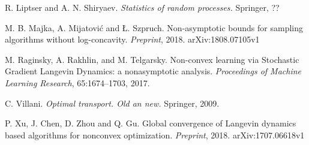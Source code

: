 \documentclass[a4paper,draft]{article}
\begin{document}
\begin{thebibliography}{00}
 R. Liptser and A. N. Shiryaev.
\newblock\emph{Statistics of random processes.}
\newblock Springer, ??

M. B. Majka, A. Mijatovi\'c and \L. Szpruch.
\newblock Non-asymptotic bounds for sampling algorithms
without log-concavity.
\newblock \emph{Preprint}, 2018. arXiv:1808.07105v1

M. Raginsky, A. Rakhlin, and M. Telgarsky.
\newblock Non-convex learning via Stochastic Gradient Langevin Dynamics: a nonasymptotic analysis.
\newblock \emph{Proceedings of Machine Learning Research}, 65:1674--1703, 2017.

 C. Villani.
\newblock \emph{Optimal transport. Old an new.}
\newblock Springer, 2009.

 P. Xu, J. Chen, D. Zhou and Q. Gu.
\newblock Global convergence of Langevin dynamics based
algorithms for nonconvex optimization.
\newblock \emph{Preprint}, 2018. arXiv:1707.06618v1

\end{thebibliography}
\end{document}
